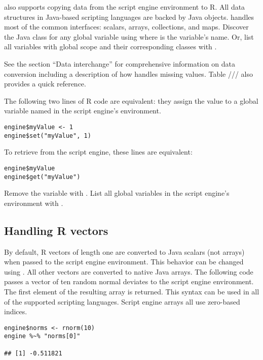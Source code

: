 also supports copying data from the script engine environment to R. All data structures in Java-based scripting languages are backed by Java objects.  handles most of the common interfaces: scalars, arrays, collections, and maps. Discover the Java class for any global variable using  where  is the variable's name. Or, list all variables with global scope and their corresponding classes with .

See the section “Data interchange” for comprehensive information on data conversion including a description of how  handles missing values. Table /// also provides a quick reference.

The following two lines of R code are equivalent: they assign the value  to a global variable named  in the script engine's environment.

\begin{verbatim}
engine$myValue <- 1
engine$set("myValue", 1)
\end{verbatim}

To retrieve  from the script engine, these lines are equivalent:

\begin{verbatim}
engine$myValue
engine$get("myValue")
\end{verbatim}

Remove the variable with . List all global variables in the script engine's environment with . 

\subsection{Handling R vectors}

By default, R vectors of length one are converted to Java scalars (not arrays) when passed to the script engine environment. This behavior can be changed using . All other vectors are converted to native Java arrays. The following code passes a vector of ten random normal deviates to the script engine environment. The first element of the resulting array is returned. This syntax can be used in all of the supported scripting languages.  Script engine arrays all use zero-based indices.

\begin{verbatim}
engine$norms <- rnorm(10)
engine %~% "norms[0]"

## [1] -0.511821
\end{verbatim}

